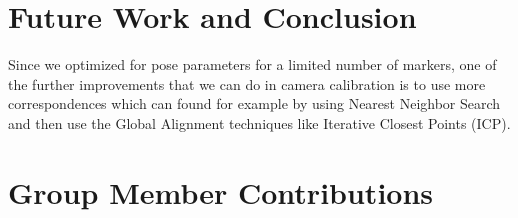 \documentclass[10pt,twocolumn,letterpaper]{article}
\begin{document}
\section{Future Work and Conclusion}
Since we optimized for pose parameters for a limited number of markers, one of the further improvements that we can do in camera calibration is to use more correspondences which can found for example by using Nearest Neighbor Search and then use the Global Alignment techniques like Iterative Closest Points (ICP).

\section{Group Member Contributions}

\newpage
{\small


}
\end{document}
